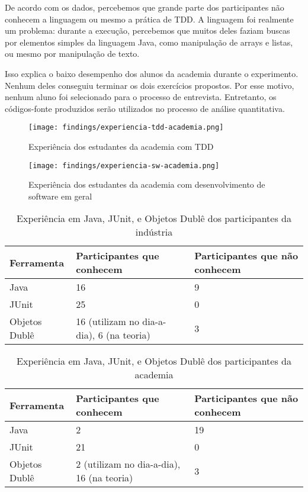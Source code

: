 De acordo com os dados, percebemos que grande parte dos participantes não conhecem a linguagem ou
mesmo a prática de TDD. A linguagem foi realmente um problema: durante a execução, percebemos
que muitos deles faziam buscas por elementos simples da linguagem Java, como manipulação de arrays
e listas, ou mesmo por manipulação de texto.

Isso explica o baixo desempenho dos alunos da academia durante
o experimento. Nenhum deles conseguiu terminar os dois exercícios propostos. Por esse
motivo, nenhum aluno foi selecionado para o processo de entrevista. Entretanto,
os códigos-fonte produzidos serão utilizados no processo de análise quantitativa.

\begin{figure}[h!]
  \centering
  \texttt{[image: findings/experiencia-tdd-academia.png]}
  \caption{Experiência dos estudantes da academia com TDD}
  \label{fig:exp-tdd-academia}
\end{figure}

\begin{figure}[h!]
  \centering
  \texttt{[image: findings/experiencia-sw-academia.png]}
  \caption{Experiência dos estudantes da academia com desenvolvimento de software em geral}
  \label{fig:exp-sw-academia}
\end{figure}


\begin{table}
	\begin{tabular}{ | p{5cm} | p{5cm} | p{5cm} | }
		\hline
		Ferramenta & Participantes que conhecem & Participantes que não conhecem\\
		\hline
		Java & 16 & 9\\
		JUnit & 25 & 0\\
		Objetos Dublê & 16 (utilizam no dia-a-dia), 6 (na teoria) & 3\\
		\hline
	\end{tabular}
	\caption{Experiência em Java, JUnit, e Objetos Dublê dos participantes da indústria}
	\label{tab:exp-industria}
\end{table}

\begin{table}
	\begin{tabular}{ | p{5cm} | p{5cm} | p{5cm} | }
		\hline
		Ferramenta & Participantes que conhecem & Participantes que não conhecem\\
		\hline
		Java & 2 & 19\\
		JUnit & 21 & 0\\
		Objetos Dublê & 2 (utilizam no dia-a-dia), 16 (na teoria) & 3\\
		\hline
	\end{tabular}
	\caption{Experiência em Java, JUnit, e Objetos Dublê dos participantes da academia}
	\label{tab:exp-academia}
\end{table}

